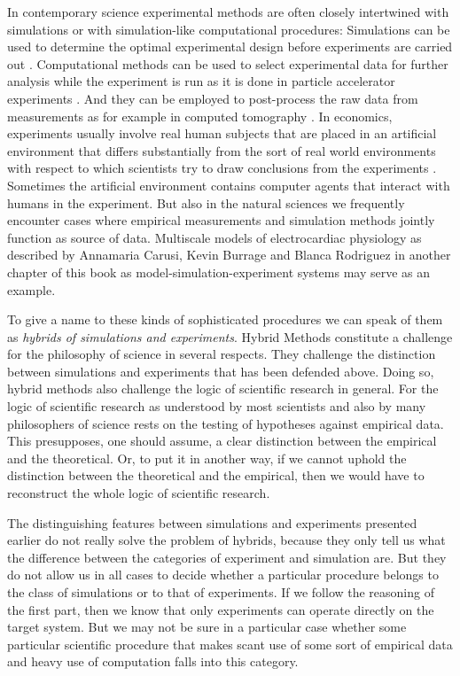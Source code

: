 \documentclass[12pt, a4paper]{article}
\numberwithin{equation}{section}
\begin{document}
In contemporary science experimental methods are often closely intertwined with simulations or with simulation-like computational procedures: Simulations can be used to determine the optimal experimental design before experiments are carried out \citep{kramer-radde:2010}. Computational methods can be used to select experimental data for further analysis while the experiment is run as it is done in particle accelerator experiments \citep{lhc-wlcg:2011}. And they can be employed to post-process the raw data from measurements as for example in computed tomography \citep{lee-carroll:2010}. In economics, experiments usually involve real human subjects that are placed in an artificial environment that differs substantially from the sort of real world environments with respect to which scientists try to draw conclusions from the experiments \citep{guala:2002, guala:2012}. Sometimes the artificial environment contains computer agents that interact with humans in the experiment. But also in the natural sciences we frequently encounter cases where empirical measurements and simulation methods jointly function as source of data. Multiscale models of electrocardiac physiology as described by Annamaria Carusi, Kevin Burrage and Blanca Rodriguez in another chapter of this book as model-simulation-experiment systems may serve as an example.

To give a name to these kinds of sophisticated procedures we can speak of them as \emph{hybrids of simulations and experiments}. Hybrid Methods constitute a challenge for the philosophy of science in several respects. They challenge the distinction between simulations and experiments that has been defended above.  
Doing so, hybrid methods also challenge the logic of scientific research in general. For the logic of scientific research as understood by most scientists and also by many philosophers of science rests on the testing of hypotheses against empirical data. This presupposes, one should assume, a clear distinction between the empirical and the theoretical. Or, to put it in another way, if we cannot uphold the distinction between the theoretical and the empirical, then we would have to reconstruct the whole logic of scientific research. 

The distinguishing features between simulations and experiments presented earlier do not really solve the problem of hybrids, because they only tell us what the difference between the categories of experiment and simulation are. But they do not allow us in all cases to decide whether a particular procedure belongs to the class of simulations or to that of experiments. If we follow the reasoning of the first part, then we know that only experiments can operate directly on the target system. But we may not be sure in a particular case whether some particular scientific procedure that makes scant use of some sort of empirical data and heavy use of computation falls into this category.
\end{document}
